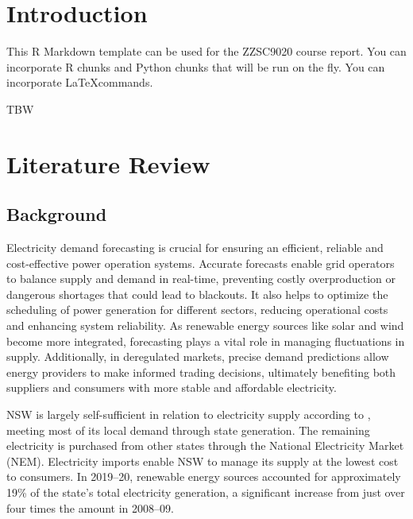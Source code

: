 \documentclass[mstat,12pt]{unswthesis}
\begin{document}
%
%






\chapter{Introduction}\label{introduction}

This R Markdown template can be used for the ZZSC9020 course report. You
can incorporate R \cite{R} chunks and Python chunks that will be run on
the fly. You can incorporate \LaTeX commands.

\bigskip

TBW

\chapter{Literature Review}\label{literature-review}

\section{Background}\label{background}

Electricity demand forecasting is crucial for ensuring an efficient,
reliable and cost-effective power operation systems. Accurate forecasts
enable grid operators to balance supply and demand in real-time,
preventing costly overproduction or dangerous shortages that could lead
to blackouts. It also helps to optimize the scheduling of power
generation for different sectors, reducing operational costs and
enhancing system reliability. As renewable energy sources like solar and
wind become more integrated, forecasting plays a vital role in managing
fluctuations in supply. Additionally, in deregulated markets, precise
demand predictions allow energy providers to make informed trading
decisions, ultimately benefiting both suppliers and consumers with more
stable and affordable electricity.

NSW is largely self-sufficient in relation to electricity supply
according to \cite{nswEnergyConsumption2021}, meeting most of its local
demand through state generation. The remaining electricity is purchased
from other states through the National Electricity Market (NEM).
Electricity imports enable NSW to manage its supply at the lowest cost
to consumers. In 2019--20, renewable energy sources accounted for
approximately 19\% of the state's total electricity generation, a
significant increase from just over four times the amount in 2008--09.
\end{document}
